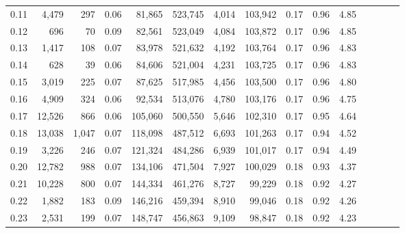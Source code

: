 \begin{tabular}{rrrcrrrrrrrrrrr}
0.11 &   4,479 &    297 &                                       0.06 &   81,865 &  523,745 &    4,014 &  103,942 &  0.17 &  0.96 &                         4.85 \\
0.12 &     696 &     70 &                                       0.09 &   82,561 &  523,049 &    4,084 &  103,872 &  0.17 &  0.96 &                         4.85 \\
0.13 &   1,417 &    108 &                                       0.07 &   83,978 &  521,632 &    4,192 &  103,764 &  0.17 &  0.96 &                         4.83 \\
0.14 &     628 &     39 &                                       0.06 &   84,606 &  521,004 &    4,231 &  103,725 &  0.17 &  0.96 &                         4.83 \\
0.15 &   3,019 &    225 &                                       0.07 &   87,625 &  517,985 &    4,456 &  103,500 &  0.17 &  0.96 &                         4.80 \\
0.16 &   4,909 &    324 &                                       0.06 &   92,534 &  513,076 &    4,780 &  103,176 &  0.17 &  0.96 &                         4.75 \\
0.17 &  12,526 &    866 &                                       0.06 &  105,060 &  500,550 &    5,646 &  102,310 &  0.17 &  0.95 &                         4.64 \\
0.18 &  13,038 &  1,047 &                                       0.07 &  118,098 &  487,512 &    6,693 &  101,263 &  0.17 &  0.94 &                         4.52 \\
0.19 &   3,226 &    246 &                                       0.07 &  121,324 &  484,286 &    6,939 &  101,017 &  0.17 &  0.94 &                         4.49 \\
0.20 &  12,782 &    988 &                                       0.07 &  134,106 &  471,504 &    7,927 &  100,029 &  0.18 &  0.93 &                         4.37 \\
0.21 &  10,228 &    800 &                                       0.07 &  144,334 &  461,276 &    8,727 &   99,229 &  0.18 &  0.92 &                         4.27 \\
0.22 &   1,882 &    183 &                                       0.09 &  146,216 &  459,394 &    8,910 &   99,046 &  0.18 &  0.92 &                         4.26 \\
0.23 &   2,531 &    199 &                                       0.07 &  148,747 &  456,863 &    9,109 &   98,847 &  0.18 &  0.92 &                         4.23 \\

\end{tabular}
